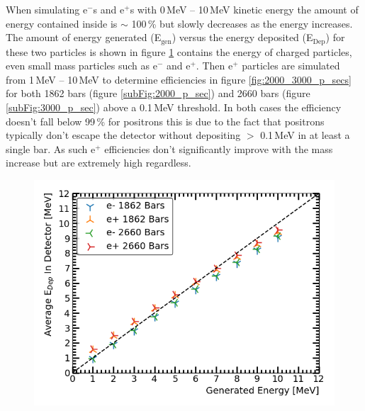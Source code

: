 When simulating e$^-$s and e$^+$s with 0\,MeV -- 10\,MeV kinetic energy the amount of energy contained inside is $\sim$ 100\,\% but slowly decreases as the energy increases. The amount of energy generated (E$_\textrm{{gen}}$) versus the energy deposited  (E$_\textrm{{Dep}}$) for these two particles is shown in figure \ref{fig:recon_gen_ele_pos} contains the energy of charged particles, even small mass particles such as e$^-$ and e$^+$. Then e$^+$ particles are simulated from 1\,MeV -- 10\,MeV to determine efficiencies in figure \ref{fig:2000_3000_p_secs} for both 1862 bars (figure \ref{subFig:2000_p_sec}) and 2660 bars (figure \ref{subFig:3000_p_sec}) above a 0.1\,MeV threshold. In both cases the efficiency doesn't fall below 99\,\% for positrons this is due to the fact that positrons typically don't escape the detector without depositing $>$ 0.1\,MeV in at least a single bar. As such e$^+$ efficiencies don't significantly improve with the mass increase but are extremely high regardless.  

\begin{figure}[!h]
 \centering
 \includegraphics[width=0.7\linewidth]{Chapter4/Figs/summedVsTruth_1862_2660_e-e+_eBars_Adjusted.png}
 \label{fig:recon_gen_ele_pos}
\end{figure} 

